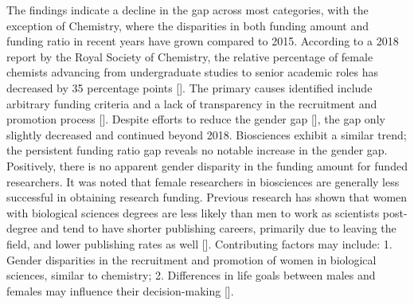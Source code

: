 The findings indicate a decline in the gap across most categories, with the exception of Chemistry, where the disparities in both funding amount and funding ratio in recent years have grown compared to 2015. According to a 2018 report by the Royal Society of Chemistry, the relative percentage of female chemists advancing from undergraduate studies to senior academic roles has decreased by 35 percentage points [\cite{RoyalChemistry}]. The primary causes identified include arbitrary funding criteria and a lack of transparency in the recruitment and promotion process [\cite{RoyalChemistry}]. Despite efforts to reduce the gender gap [\cite{RSCFramework2023}], the gap only slightly decreased and continued beyond 2018. Biosciences exhibit a similar trend; the persistent funding ratio gap reveals no notable increase in the gender gap. Positively, there is no apparent gender disparity in the funding amount for funded researchers. It was noted that female researchers in biosciences are generally less successful in obtaining research funding. Previous research has shown that women with biological sciences degrees are less likely than men to work as scientists post-degree and tend to have shorter publishing careers, primarily due to leaving the field, and lower publishing rates as well [\cite{malespina2023gender}]. Contributing factors may include: 1. Gender disparities in the recruitment and promotion of women in biological sciences, similar to chemistry; 2. Differences in life goals between males and females may influence their decision-making [\cite{elliott2016editor}].\\

